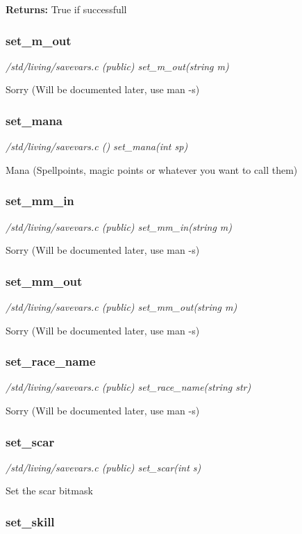 {\bf Returns:}    True if successfull


\subsubsection{set\_m\_out}

{\em /std/living/savevars.c (public) set\_m\_out(string m)}

Sorry (Will be documented later, use man -s)


\subsubsection{set\_mana}

{\em /std/living/savevars.c () set\_mana(int sp)}

Mana 
(Spellpoints, magic points or whatever you want to call them)


\subsubsection{set\_mm\_in}

{\em /std/living/savevars.c (public) set\_mm\_in(string m)}

Sorry (Will be documented later, use man -s)


\subsubsection{set\_mm\_out}

{\em /std/living/savevars.c (public) set\_mm\_out(string m)}

Sorry (Will be documented later, use man -s)


\subsubsection{set\_race\_name}

{\em /std/living/savevars.c (public) set\_race\_name(string str)}

Sorry (Will be documented later, use man -s)


\subsubsection{set\_scar}

{\em /std/living/savevars.c (public) set\_scar(int s)}

Set the scar bitmask


\subsubsection{set\_skill}

